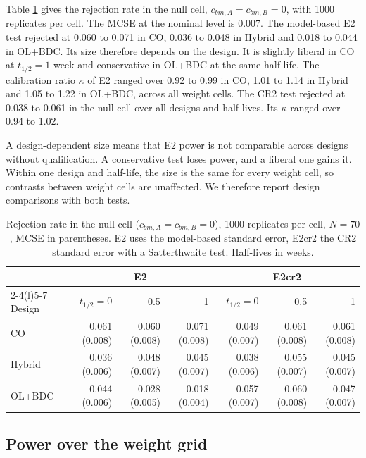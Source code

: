 \documentclass[
  11pt,
]{article}
\begin{document}
Table \ref{tab:null} gives the rejection rate in the null cell,
\(c_{bm,A} = c_{bm,B} = 0\), with 1000 replicates per cell.
The MCSE at the nominal level is 0.007.
The model-based E2 test rejected at 0.060 to 0.071 in CO,
0.036 to 0.048 in Hybrid and 0.018 to 0.044 in
OL+BDC. Its size therefore depends on the design. It is slightly
liberal in CO at \(t_{1/2} = 1\) week and conservative in OL+BDC at the
same half-life. The calibration ratio \(\kappa\) of E2 ranged over
0.92 to 0.99 in CO, 1.01 to 1.14 in Hybrid and
1.05 to 1.22 in OL+BDC, across all weight cells. The CR2
test rejected at 0.038 to 0.061 in the null cell over all designs
and half-lives. Its \(\kappa\) ranged over 0.94 to 1.02.

A design-dependent size means that E2 power is not comparable across
designs without qualification. A conservative test loses power, and a
liberal one gains it. Within one design and half-life, the size is
the same for every weight cell, so contrasts between weight cells are
unaffected. We therefore report design comparisons with both tests.

\begin{table}[H]
\small\centering
\caption{Rejection rate in the null cell ($c_{bm,A} = c_{bm,B} = 0$), 1000 replicates per cell, $N = 70$, MCSE in parentheses. E2 uses the model-based standard error, E2cr2 the CR2 standard error with a Satterthwaite test. Half-lives in weeks.}
\label{tab:null}
\begin{tabular}{lrrrrrr}
\toprule
& \multicolumn{3}{c}{E2} & \multicolumn{3}{c}{E2cr2} \\
\cmidrule(lr){2-4}\cmidrule(l){5-7}
Design & $t_{1/2} = 0$ & 0.5 & 1 & $t_{1/2} = 0$ & 0.5 & 1 \\
\midrule
CO & 0.061 (0.008) & 0.060 (0.008) & 0.071 (0.008) & 0.049 (0.007) & 0.061 (0.008) & 0.061 (0.008) \\
Hybrid & 0.036 (0.006) & 0.048 (0.007) & 0.045 (0.007) & 0.038 (0.006) & 0.055 (0.007) & 0.045 (0.007) \\
OL+BDC & 0.044 (0.006) & 0.028 (0.005) & 0.018 (0.004) & 0.057 (0.007) & 0.060 (0.008) & 0.047 (0.007) \\
\bottomrule
\end{tabular}
\end{table}

\subsection{Power over the weight grid}\label{power-over-the-weight-grid}
\end{document}
